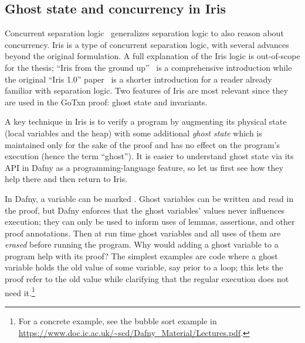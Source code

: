 \subsection{Ghost state and concurrency in Iris}
\label{sec:perennial:concurrency}

Concurrent separation logic~\cite{brookes:csl} generalizes separation logic to
also reason about concurrency. Iris is a type of concurrent separation logic,
with several advances beyond the original formulation. A full
explanation of the Iris logic is out-of-scope for the thesis; ``Iris from the
ground up''~\cite{jung:iris-jfp} is a comprehensive introduction while the
original ``Iris 1.0'' paper~\cite{jung:iris-1} is a shorter introduction for a
reader already familiar with separation logic. Two features of Iris are most
relevant since they are used in the GoTxn proof: ghost state and invariants.

A key technique in Iris is to verify a program by augmenting its
physical state (local variables and the heap) with some additional \emph{ghost
state} which is maintained only for the sake of the proof and has no effect on
the program's execution (hence the term ``ghost''). It is easier to understand
ghost state via its API in Dafny as a programming-language feature, so let
us first see how they help there and then return to Iris.

In Dafny, a variable can be marked . Ghost variables can be written
and read in the proof, but Dafny enforces that the ghost variables' values never
influences execution; they can only be used to inform uses of lemmas,
assertions, and other proof annotations. Then at run time ghost variables and all
uses of them are \emph{erased} before running the program. Why would adding a
ghost variable to a program help with its proof? The simplest examples are code
where a ghost variable holds the old value of some variable, say prior to a
loop; this lets the proof refer to the old value while clarifying that the
regular execution does not need it.\footnote{For a concrete example, see the
bubble sort example in
\url{https://www.doc.ic.ac.uk/~scd/Dafny_Material/Lectures.pdf}.}

